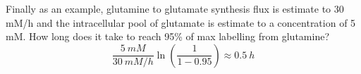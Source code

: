 Finally as an example, glutamine to glutamate synthesis flux is estimate to 30 mM/h and the intracellular pool of glutamate is estimate to a concentration of 5 mM.
How long does it take to reach 95\% of max labelling from glutamine?
\begin{equation}
     \frac{5\ mM}{30\ mM/h} \ln\left( \frac{1}{1 - 0.95} \right) \approx 0.5\ h
\label{eq:app_ch1:B_glu}
\end{equation}





